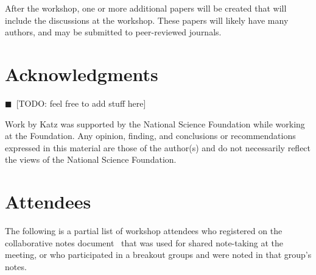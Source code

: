 \documentclass[11pt, oneside]{amsart}
\newcommand{\todo}[1]{{\color{blue}$\blacksquare$~\textsf{[TODO: #1]}}}
\begin{document}
After the workshop, one or more additional papers will be created that will
include the discussions at the workshop. These papers will likely have many
authors, and may be submitted to peer-reviewed journals.

\section*{Acknowledgments} \label{sec:acks}
\todo{feel free to add stuff here}

Work by Katz was supported by the National Science Foundation while working at
the Foundation. Any opinion, finding, and conclusions or recommendations
expressed in this material are those of the author(s) and do not necessarily
reflect the views of the National Science Foundation.


\appendix
\section{Attendees}  \label{sec:attendees}
The following is a partial list of workshop attendees who registered on the
collaborative notes document~\cite{WSSSPE2-google-notes} that was used
for shared note-taking at the meeting, or who participated in a breakout groups
and were noted in that group's notes.
\end{document}
